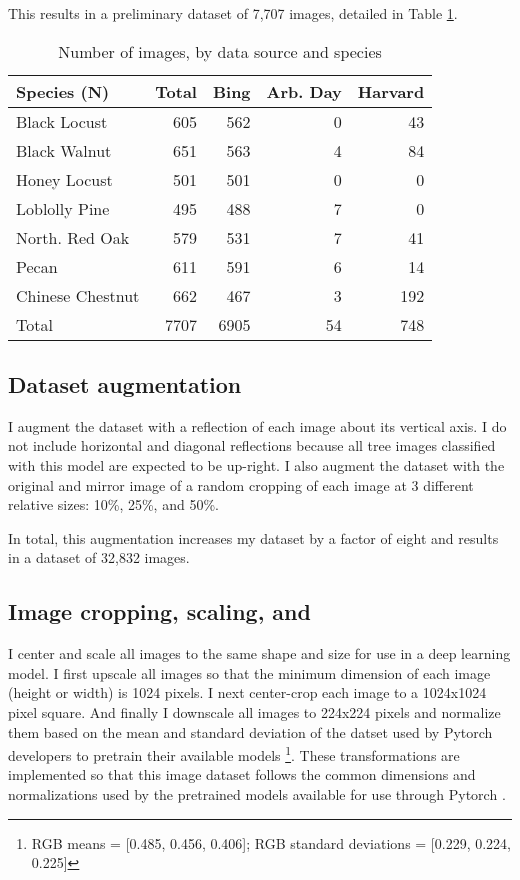 \documentclass[10pt,twocolumn,letterpaper]{article}
\begin{document}
This results in a preliminary dataset of 7,707 images, detailed in Table \ref{tab:dataset_og}.

\begin{table}[!htbp]
   \begin{center}
    \small
   \begin{tabular}{|l|r|r|r|r|}
   \hline
   Species (N) & Total & Bing & Arb. Day & Harvard \\
   \hline\hline
   Black Locust & 605 & 562 & 0 & 43\\
    Black Walnut & 651 & 563 & 4 & 84\\
    Honey Locust & 501 & 501 & 0 & 0\\
    Loblolly Pine & 495 & 488 & 7 & 0\\
    North. Red Oak & 579 & 531 & 7 & 41\\
    Pecan & 611 & 591 & 6 & 14\\
    Chinese Chestnut & 662 & 467 & 3 &  192\\
    \hline\hline
    Total & 7707 & 6905 & 54 & 748\\
   \hline
   \end{tabular}
   \end{center}
   \caption{\label{tab:dataset_og} Number of images, by data source and species}
   \end{table}

\subsection{Dataset augmentation}

I augment the dataset with a reflection of each image about its vertical axis. I do not include horizontal and diagonal reflections because all tree images classified with this model are expected to be up-right. I also augment the dataset with the original and mirror image of a random cropping of each image at 3 different relative sizes: 10\%, 25\%, and 50\%. 

In total, this augmentation increases my dataset by a factor of eight and results in a dataset of 32,832 images.

\subsection{Image cropping, scaling, and }

I center and scale all images to the same shape and size for use in a deep learning model. I first upscale all images so that the minimum dimension of each image (height or width) is 1024 pixels. I next center-crop each image to a 1024x1024 pixel square. And finally I downscale all images to 224x224 pixels and normalize them based on the mean and standard deviation of the datset used by Pytorch developers to pretrain their available models \footnote{RGB means = [0.485, 0.456, 0.406]; RGB standard deviations = [0.229, 0.224, 0.225]}. These transformations are implemented so that this image dataset follows the common dimensions and normalizations used by the pretrained models available for use through Pytorch \cite{PyTorch}. 
\end{document}
